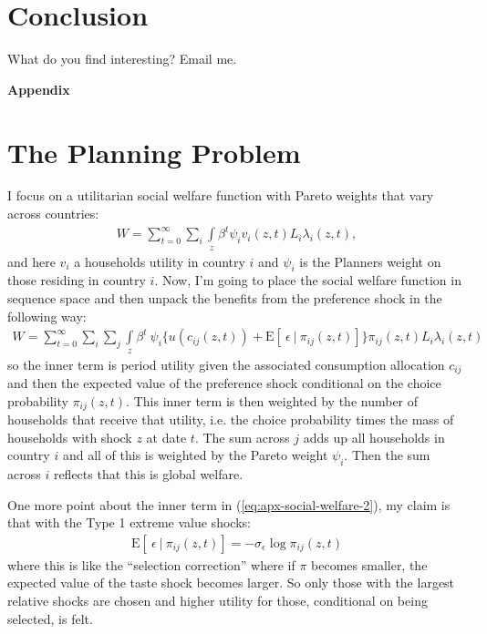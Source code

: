 \documentclass[12pt,pdftex]{article}
\begin{document}
\begin{onehalfspacing}
\section{Conclusion}

What do you find interesting? Email me.



\appendix

\clearpage
\newpage

\begin{center}
\textbf{\Large Appendix}
\end{center}


\section{The Planning Problem}\label{sec:apx-planner}

I focus on a utilitarian social welfare function with Pareto weights that vary across countries:
\begin{align}
W = \sum_{t=0}^{\infty} \sum_{i}  \int\limits_{z} \beta^{t} \psi_{i} v_{i}(z,t) L_{i}\lambda_{i}(z,t),
\label{eq:apx-social-welfare}
\end{align}
and here $v_i$ a households utility in country $i$ and $\psi_{i}$ is the Planners weight on those residing in country $i$. Now, I'm going to place the social welfare function in sequence space and then unpack the benefits from the preference shock in the following way:
\begin{align}
W = \sum_{t=0}^{\infty}  \sum_{i}  \sum_{j}  \int\limits_{z}  \beta^{t} \  \psi_{i} \bigg \{  u(c_{ij}(z, t) ) + \mathrm{E}[ \ \epsilon \ | \ \pi_{ij}(z,t) ] \bigg \}\pi_{ij}(z,t) L_{i} \lambda_{i}(z, t)
\label{eq:apx-social-welfare-2}
\end{align}
so the inner term is period utility given the associated consumption allocation $c_{ij}$ and then the expected value of the preference shock conditional on the choice probability $\pi_{ij}(z,t)$. This inner term is then weighted by the number of households that receive that utility, i.e. the choice probability times the mass of households with shock $z$ at date $t$. The sum across $j$ adds up all households in country $i$ and all of this is weighted by the Pareto weight $\psi_{i}$. Then the sum across $i$ reflects that this is global welfare.

One more point about the inner term in (\ref{eq:apx-social-welfare-2}), my claim is that with the Type 1 extreme value shocks:
\begin{align}
\mathrm{E}[ \ \epsilon \ | \ \pi_{ij}(z,t) ] = -\sigma_{\epsilon} \log \pi_{ij}(z,t)
\end{align}
where this is like the ``selection correction'' where if $\pi$ becomes smaller, the expected value of the taste shock becomes larger. So only those with the largest relative shocks are chosen and higher utility for those, conditional on being selected, is felt.


\end{onehalfspacing}
\end{document}
